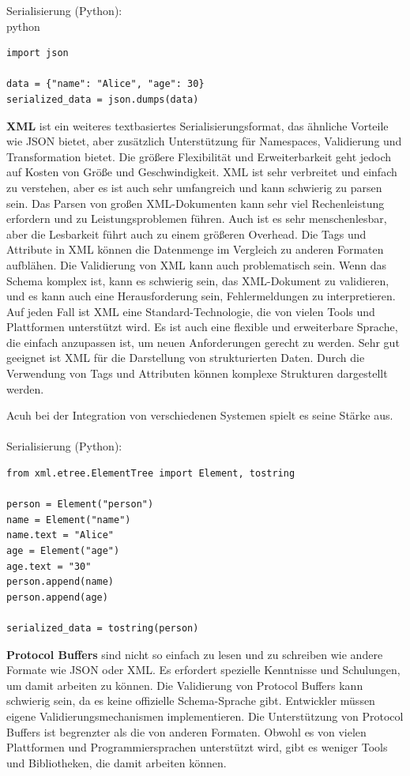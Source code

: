 Serialisierung (Python):\\
python\\
\begin{lstlisting}[caption={JSON},captionpos=b,label={lst:json}]
import json

data = {"name": "Alice", "age": 30}
serialized_data = json.dumps(data)

\end{lstlisting}
\textbf{XML} ist ein weiteres textbasiertes Serialisierungsformat, das ähnliche Vorteile wie JSON bietet, aber zusätzlich Unterstützung für Namespaces, Validierung und Transformation bietet. Die größere Flexibilität und Erweiterbarkeit geht jedoch auf Kosten von Größe und Geschwindigkeit.
XML ist sehr verbreitet und einfach zu verstehen, aber es ist auch sehr umfangreich und kann schwierig zu parsen sein. Das Parsen von großen XML-Dokumenten kann sehr viel Rechenleistung erfordern und zu Leistungsproblemen führen.
Auch ist es sehr menschenlesbar, aber die Lesbarkeit führt auch zu einem größeren Overhead. Die Tags und Attribute in XML können die Datenmenge im Vergleich zu anderen Formaten aufblähen. Die Validierung von XML kann auch problematisch sein. Wenn das Schema komplex ist, kann es schwierig sein, das XML-Dokument zu validieren, und es kann auch eine Herausforderung sein, Fehlermeldungen zu interpretieren. Auf jeden Fall ist XML eine Standard-Technologie, die von vielen Tools und Plattformen unterstützt wird. Es ist auch eine flexible und erweiterbare Sprache, die einfach anzupassen ist, um neuen Anforderungen gerecht zu werden.
Sehr gut geeignet ist XML für die Darstellung von strukturierten Daten. Durch die Verwendung von Tags und Attributen können komplexe Strukturen dargestellt werden.

Acuh bei der Integration von verschiedenen Systemen spielt es seine Stärke aus.\\\\

Serialisierung (Python):\\
\begin{lstlisting}[caption={XML},captionpos=b,label={lst:xml}]
from xml.etree.ElementTree import Element, tostring

person = Element("person")
name = Element("name")
name.text = "Alice"
age = Element("age")
age.text = "30"
person.append(name)
person.append(age)

serialized_data = tostring(person)
\end{lstlisting}
\textbf{Protocol Buffers} sind nicht so einfach zu lesen und zu schreiben wie andere Formate wie JSON oder XML. Es erfordert spezielle Kenntnisse und Schulungen, um damit arbeiten zu können. Die Validierung von Protocol Buffers kann schwierig sein, da es keine offizielle Schema-Sprache gibt. Entwickler müssen eigene Validierungsmechanismen implementieren. Die Unterstützung von Protocol Buffers ist begrenzter als die von anderen Formaten. Obwohl es von vielen Plattformen und Programmiersprachen unterstützt wird, gibt es weniger Tools und Bibliotheken, die damit arbeiten können.

